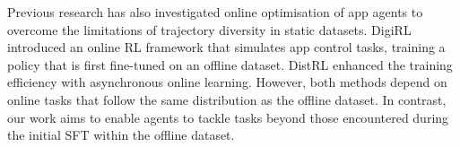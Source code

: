 Previous research has also investigated online optimisation of app agents to overcome the limitations of trajectory diversity in static datasets. DigiRL \citep{digirl} introduced an online RL framework that simulates app control tasks, training a policy that is first fine-tuned on an offline dataset. DistRL \citep{wang2024distrl} enhanced the training efficiency with asynchronous online learning. However, both methods depend on online tasks that follow the same distribution as the offline dataset. In contrast, our work aims to enable agents to tackle tasks beyond those encountered during the initial SFT within the offline dataset.